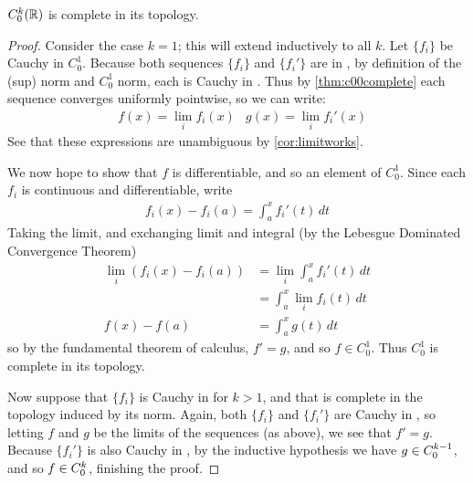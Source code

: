       \begin{thm}
        \label{thm:ck0complete}
        ${C^k_0}(\mathbb{R})$ is complete in its topology.
      \end{thm}
      \begin{proof}
        Consider the case $k=1$; this will extend inductively to all $k$.
        Let $\{f_i\}$ be Cauchy in $C^1_0$.
        Because both sequences $\{f_i\}$ and $\{f_i'\}$ are in \Coo, by definition of the \Coo (sup) norm and $C^1_0$ norm, each is Cauchy in \Coo.
        Thus by \cref{thm:c00complete} each sequence converges uniformly pointwise, so we can write:
        \begin{align*}
          &f(x)=\lim_i f_i(x) &g(x)=\lim_i f_i'(x)
        \end{align*}
        See that these expressions are unambiguous by \cref{cor:limitworks}.

        We now hope to show that $f$ is differentiable, and so an element of $C^1_0$.
        Since each $f_i$ is continuous and differentiable, write
        \begin{align*}
          f_i(x)-f_i(a) = \int_a^x f_i'(t)\,dt
        \end{align*}
        Taking the limit, and exchanging limit and integral (by the Lebesgue Dominated Convergence Theorem)
        \begin{align*}
          \lim_i \left( f_i(x)-f_i(a) \right) &= \lim_i\int_a^x f_i'(t)\,dt\\
          &= \int_a^x\lim_if_i(t)\,dt\\
          f(x)-f(a) &= \int_a^x g(t)\,dt
        \end{align*}
        so by the fundamental theorem of calculus, $f'=g$, and so $f\in C^1_0$.
        Thus $C^1_0$ is complete in its topology.

        Now suppose that $\{f_i\}$ is Cauchy in \Cko for $k>1$, and that \Ckmo is complete in the topology induced by its norm.
        Again, both $\{f_i\}$ and $\{f_i'\}$ are Cauchy in \Coo, so letting $f$ and $g$ be the limits of the sequences (as above), we see that $f'=g$.
        Because $\{f_i'\}$ is also Cauchy in \Ckmo, by the inductive hypothesis we have $g\in{C^{k-1}_0}$, and so $f\in{C^k_0}$, finishing the proof.
      \end{proof}


